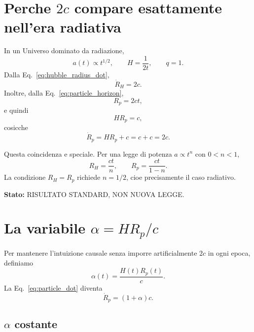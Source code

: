 \documentclass[11pt,a4paper]{article}
\newcommand{\status}[1]{\textsf{#1}}
\begin{document}
\section{Perche $2c$ compare esattamente nell'era radiativa}

In un Universo dominato da radiazione,
\begin{equation}
 a(t)\propto t^{1/2},\qquad H=\frac{1}{2t},\qquad q=1.
\end{equation}
Dalla Eq.~\eqref{eq:hubble_radius_dot},
\begin{equation}
 \boxed{\dot R_H=2c.}
\end{equation}
Inoltre, dalla Eq.~\eqref{eq:particle_horizon},
\begin{equation}
 R_p=2ct,
\end{equation}
e quindi
\begin{equation}
 HR_p=c,
\end{equation}
cosicche
\begin{equation}
 \boxed{\dot R_p=HR_p+c=c+c=2c.}
\end{equation}

Questa coincidenza e speciale. Per una legge di potenza $a\propto t^n$ con $0<n<1$,
\begin{equation}
 R_H=\frac{ct}{n},\qquad R_p=\frac{ct}{1-n}.
\end{equation}
La condizione $R_H=R_p$ richiede $n=1/2$, cioe precisamente il caso radiativo.

\textbf{Stato:} \status{RISULTATO STANDARD, NON NUOVA LEGGE}.

\section{La variabile $\alpha=HR_p/c$}

Per mantenere l'intuizione causale senza imporre artificialmente $2c$ in ogni epoca, definiamo
\begin{equation}
 \boxed{\alpha(t)=\frac{H(t)R_p(t)}{c}.}
 \label{eq:alpha_def}
\end{equation}
La Eq.~\eqref{eq:particle_dot} diventa
\begin{equation}
 \boxed{\dot R_p=(1+\alpha)c.}
\end{equation}

\subsection{$\alpha$ costante}
\end{document}
